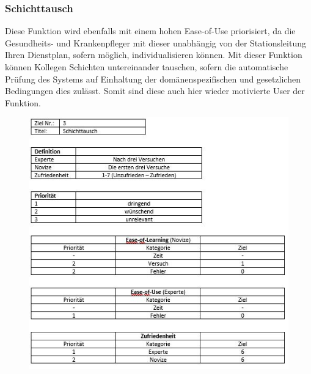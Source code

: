 \documentclass[11pt,
paper=a4,
bibtotocnumbered,	  %
liststotocnumbered,  %
DIV=calc,		  %
tablecaptionabove,	  %
headinclude,
]{article}
\begin{document}
\subsubsection{Schichttausch}
Diese Funktion wird ebenfalls mit einem hohen Ease-of-Use priorisiert, da die Gesundheits- und Krankenpfleger mit dieser unabhängig von der Stationsleitung Ihren Dienstplan, sofern möglich, individualisieren können. Mit dieser Funktion können Kollegen Schichten untereinander tauschen, sofern die automatische Prüfung des Systems auf Einhaltung der domänenspezifischen und gesetzlichen Bedingungen dies zulässt. Somit sind diese auch hier wieder motivierte User der Funktion.
\begin{figure}[H]
\includegraphics[width=1\textwidth]{Bilder/Schichttausch.jpg}
\end{figure}
\end{document}
